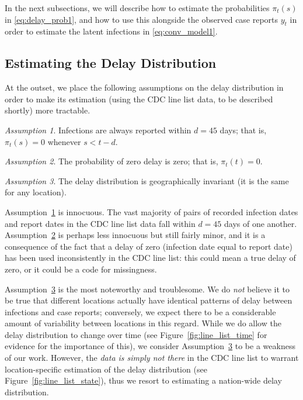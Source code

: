\documentclass[sts]{imsart}
\theoremstyle{plain}
\theoremstyle{definition}
\theoremstyle{remark}
\newtheorem{assumption}{Assumption}
\begin{document}
In the next subsections, we will describe how to estimate the probabilities
$\pi_t(s)$ in \eqref{eq:delay_prob1}, and how to use this alongside the observed
case reports $y_t$ in order to estimate the latent infections in
\eqref{eq:conv_model1}. 

\subsection{Estimating the Delay Distribution} 
\label{sec:delay_distribution}

At the outset, we place the following assumptions on the delay distribution in 
order to make its estimation (using the CDC line list data, to be described
shortly) more tractable.   

\begin{assumption}
\label{asm:delay_support} 
Infections are always reported within $d=45$ days; that is, $\pi_t(s) = 0$
whenever $s < t-d$. 
\end{assumption}

\begin{assumption}
\label{asm:zero_at_zero}
The probability of zero delay is zero; that is, $\pi_t(t) = 0$.
\end{assumption}

\begin{assumption}
\label{asm:geo_invar}
The delay distribution is geographically invariant (it is the same for any
location). 
\end{assumption}

Assumption~\ref{asm:delay_support} is innocuous. The vast majority of pairs of
recorded infection dates and report dates in the CDC line list data fall within
$d=45$ days of one another. Assumption~\ref{asm:zero_at_zero} is perhaps less
innocuous but still fairly minor, and it is a consequence of the fact that a
delay of zero (infection date equal to report date) has been used inconsistently
in the CDC line list: this could mean a true delay of zero, or it could be a
code for missingness.

Assumption~\ref{asm:geo_invar} is the most noteworthy and troublesome. We do
\emph{not} believe it to be true that different locations actually have
identical patterns of delay between infections and case reports; conversely, we
expect there to be a considerable amount of variability between locations in
this regard. While we do allow the delay distribution to change over time (see
Figure~\ref{fig:line_list_time} for evidence for the importance of this), we
consider Assumption~\ref{asm:geo_invar} to be a weakness of our work. However,
the \emph{data is simply not there} in the CDC line list to warrant
location-specific estimation of the delay distribution (see
Figure~\ref{fig:line_list_state}), thus we resort to estimating a nation-wide
delay distribution.
\end{document}
